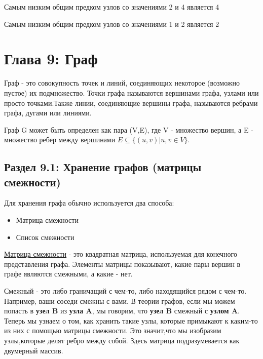 \vspace{\baselineskip}
Самым низким общим предком   узлов со значениями 2 и 4 является 4

\vspace{\baselineskip}
Самым низким общим предком   узлов со значениями 1 и 2 является 2

\vspace{\baselineskip}
\chapter*{Глава 9: Граф}
\vspace{-0.5cm}
Граф - это совокупность точек и линий, соединяющих некоторое (возможно пустое) их подмножество. Точки графа называются вершинами графа, узлами или просто точками.Также линии, соединяющие вершины графа, называются ребрами графа, дугами или линиями.

\vspace{\baselineskip}
Граф G может быть определен как пара (V,E), где V - множество вершин, а E - множество ребер между вершинами $E \subseteq \{(u,v) | u,v \in V \}$.

\vspace{-0.2cm}
\section*{Раздел 9.1: Хранение графов (матрицы смежности)}
Для хранения графа обычно используется два способа:

\vspace{-0.2cm}
\begin{itemize}
  \item Матрица смежности
  \vspace{-0.4cm}
  \item Список смежности
\end{itemize}

\vspace{-0.2cm}
\href{https://en.wikipedia.org/wiki/Adjacency_matrix}{\underline{Матрица смежности}} - это квадратная матрица, используемая для конечного представления графа. Элементы матрицы показывают, какие пары вершин в графе являются  смежными, а какие - нет.

\vspace{\baselineskip}
Смежный - это либо граничащий с чем-то, либо находящийся рядом с чем-то. Например, ваши соседи смежны с вами. В теории графов, если мы можем попасть в \textbf{узел B} из \textbf{узла A}, мы говорим, что \textbf{узел B} смежный с \textbf{узлом A}. Теперь мы узнаем о том, как хранить такие узлы, которые примыкают к каким-то  из них с помощью матрицы смежности. Это значит,что мы изобразим узлы,которые делят ребро между собой. Здесь матрица подразумевается как двумерный массив.

